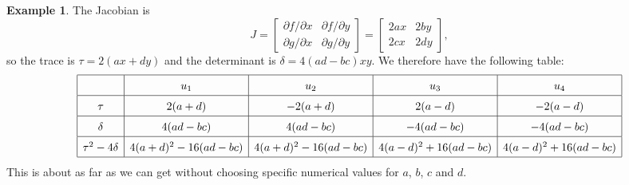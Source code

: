 \documentclass[reqno]{amsart}
\theoremstyle{definition}
\newtheorem{example}[theorem]{Example}
\begin{document}
\begin{example}
 The Jacobian is 
 \[ J = \left[\begin{array}{cc} \partial f/\partial x & \partial f/\partial y \\
             \partial g/\partial x & \partial g/\partial y \end{array}\right]
      = \left[\begin{array}{cc} 2ax & 2by \\
             2cx & 2dy \end{array}\right],
 \]
 so the trace is $\tau=2(ax+dy)$ and the determinant is
 $\delta=4(ad-bc)xy$.  We therefore have the following table:
 \[ \renewcommand\arraystretch{1.5} \begin{array}{|c|c|c|c|c|}
  \hline
              & u_1                & u_2                & u_3                & u_4               \\ \hline
  \tau        & 2(a+d)             & -2(a+d)            & 2(a-d)             & -2(a-d)           \\ \hline 
  \delta         & 4(ad-bc)           & 4(ad-bc)           & -4(ad-bc)          & -4(ad-bc)         \\ \hline
  \tau^2-4\delta & 4(a+d)^2-16(ad-bc) & 4(a+d)^2-16(ad-bc) & 4(a-d)^2+16(ad-bc) & 4(a-d)^2+16(ad-bc)\\ \hline
 \end{array} \]
 This is about as far as we can get without
 choosing specific numerical values for $a$, $b$, $c$ and $d$.


\end{example}
\end{document}
